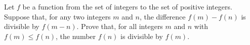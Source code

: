 Let 
$f$
 be a function from the set of integers to the set of positive integers. Suppose that, for any two integers 
$m$
 and 
$n$, 
 the difference 
$f(m) - f(n)$
 is divisible by 
$f(m- n)$.
 Prove that, for all integers 
$m$
 and 
$n$
 with 
$f(m) \leq f(n)$, 
 the number 
$f(n)$
 is divisible by 
$f(m)$.
